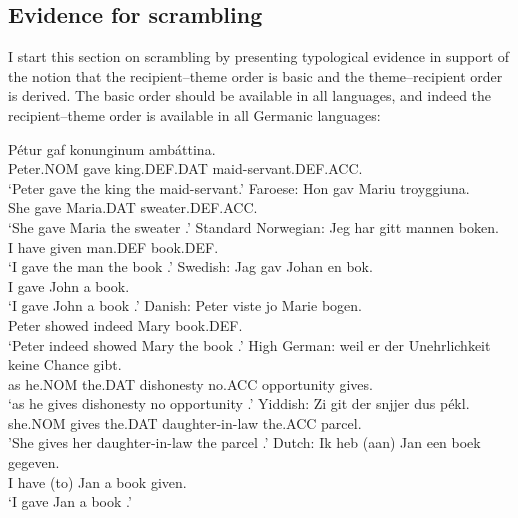 	\subsection{Evidence for scrambling}
	I start this section on scrambling by presenting typological evidence in support of the notion that the recipient--theme order is basic and the theme--recipient order is derived. The basic order should be available in all languages, and indeed the recipient--theme order is available in all Germanic languages:
	\begin{exe}
\ex
\begin{xlist}
	\ex \label{ex:ice-rt}
\gll P\'{e}tur gaf konunginum amb\'{a}ttina.\\
Peter.NOM gave king.DEF.DAT maid-servant.DEF.ACC.\\
\trans `Peter gave the king the maid-servant.'
\ex Faroese:\label{ex:far-rt}
\gll Hon gav Mariu troyggiuna.\\
She gave Maria.DAT sweater.DEF.ACC.\\
\trans `She gave Maria the sweater \citep{Lundquist.2013b}.'
\ex Standard Norwegian: \label{ex:nor-rt}
\gll Jeg har gitt mannen boken.\\
I have given man.DEF book.DEF.\\
\trans `I gave the man the book \citep[ex 10]{Sprouse.1995}.'
\ex Swedish:\label{ex:sw-rt}
\gll Jag gav Johan en bok.\\
I gave John a book.\\
\trans `I gave John a book \citep{Holmberg.1995}.'
\ex Danish:\label{ex:dan-rt}
\gll Peter viste jo Marie bogen.\\
Peter showed indeed Mary book.DEF.\\
\trans `Peter indeed showed Mary the book \citep{Vikner.1989}.'
\ex High German:\label{ex:hg-rt}
\gll weil er der Unehrlichkeit keine Chance gibt.\\
as he.NOM the.DAT dishonesty no.ACC opportunity gives.\\
\trans `as he gives dishonesty no opportunity \citep[162]{Draye.1996}.'
\ex Yiddish:\label{ex:yid-rt}
\gll Zi git der snjjer dus pékl. \\
she.NOM gives the.DAT daughter-in-law the.ACC parcel.\\
\trans 'She gives her daughter-in-law the parcel \citep[ex 190a]{Birnbaum.1979}.'
\ex Dutch:\label{ex:dut-rt}
\gll Ik heb (aan) Jan een boek gegeven.\\
I have (to) Jan a book given.\\
\trans `I gave Jan a book \citep{Tiersma.1985}.'

\end{xlist}
\end{exe}
